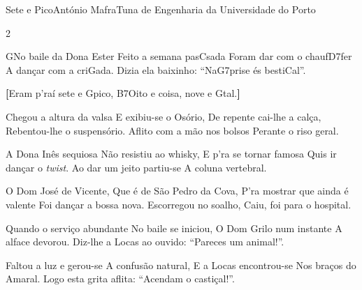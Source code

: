 \begin{musica}{Sete e Pico}{António Mafra}{Tuna de Engenharia da Universidade do Porto}
\begin{multicols}{2}

\ac{G}{No} baile da Dona Ester
Feito a semana pas\ac{C}{sa}da
Foram dar com o chauf\ac{D7}{fer}
A dançar com a cri\ac{G}{a}da.
Dizia ela baixinho:
“Na\ac{G7}{pri}se és besti\ac{C}{al}”.

\textbf{[}Eram p’raí sete e \ac{G}{pi}co,
\ac{B7}{Oi}to e coisa, nove e \ac{G}{tal}.\textbf{]} 

Chegou a altura da valsa
E exibiu-se o Osório,
De repente cai-lhe a calça,
Rebentou-lhe o suspensório.
Aflito com a mão nos bolsos
Perante o riso geral.


A Dona Inês sequiosa
Não resistiu ao whisky,
E p’ra se tornar famosa
Quis ir dançar o \textit{twist}.
Ao dar um jeito partiu-se
A coluna vertebral.


O Dom José de Vicente,
Que é de São Pedro da Cova,
P’ra mostrar que ainda é valente
Foi dançar a bossa nova.
Escorregou no soalho,
Caiu, foi para o hospital.


Quando o serviço abundante
No baile se iniciou,
O Dom Grilo num instante
A alface devorou.
Diz-lhe a Locas ao ouvido:
“Pareces um animal!”.


Faltou a luz e gerou-se
A confusão natural,
E a Locas encontrou-se
Nos braços do Amaral.
Logo esta grita aflita:
“Acendam o castiçal!”.

\end{multicols}

\end{musica}
